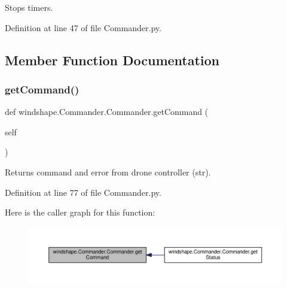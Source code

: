 \begin{DoxyVerb}Stops timers.\end{DoxyVerb}
 

Definition at line 47 of file Commander.\+py.



\subsection{Member Function Documentation}
\mbox{\label{classwindshape_1_1_commander_1_1_commander_a5251ca75fd2309bac57fd4abf00b7963}} 
\subsubsection{\texorpdfstring{get\+Command()}{getCommand()}}
{\footnotesize\ttfamily def windshape.\+Commander.\+Commander.\+get\+Command (\begin{DoxyParamCaption}\item[{}]{self }\end{DoxyParamCaption})}

\begin{DoxyVerb}Returns command and error from drone controller (str).\end{DoxyVerb}
 

Definition at line 77 of file Commander.\+py.

Here is the caller graph for this function\+:\nopagebreak
\begin{figure}[H]
\begin{center}
\leavevmode
\includegraphics[width=350pt]{classwindshape_1_1_commander_1_1_commander_a5251ca75fd2309bac57fd4abf00b7963_icgraph}
\end{center}
\end{figure}
\mbox{\label{classwindshape_1_1_commander_1_1_commander_ad00a4b5be5f80bc13beef2d9ab6af3c4}} 
